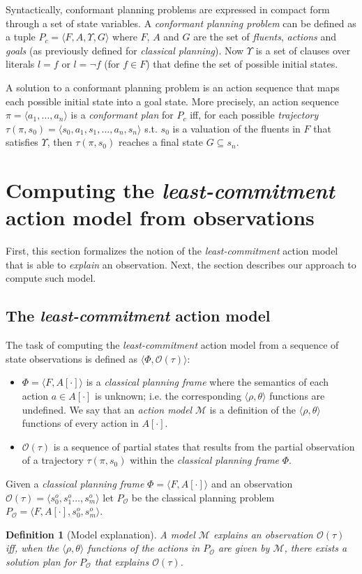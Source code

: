 \documentclass{article}
\newcommand{\tup}[1]{{\langle #1 \rangle}}
\newtheorem{definition}[theorem]{Definition}
\begin{document}
Syntactically, conformant planning problems are expressed in compact form through a set of state variables. A {\em conformant planning problem} can be defined as a tuple $P_c=\tup{F,A,\Upsilon,G}$ where $F$, $A$ and $G$ are the set of {\em fluents}, {\em actions} and {\em goals} (as previously defined for {\em classical planning}). Now $\Upsilon$ is a set of clauses over literals $l=f$ or $l=\neg f$ (for $f\in F$) that define the set of possible initial states. 

A solution to a conformant planning problem is an action sequence that maps each possible initial state into a goal state. More precisely, an action sequence $\pi=\tup{a_1, \ldots, a_n}$ is a {\em conformant plan} for $P_c$ iff, for each possible {\em trajectory} $\tau(\pi,s_0)=\tup{s_0, a_1, s_1, \ldots, a_n, s_n}$ s.t. $s_0$ is a valuation of the fluents in $F$ that satisfies $\Upsilon$, then $\tau(\pi,s_0)$ reaches a final state $G \subseteq s_n$. 


\section{Computing the {\em least-commitment} action model from observations}
First, this section formalizes the notion of the {\em least-commitment} action model that is able to {\em explain} an observation. Next, the section describes our approach to compute such model. 

\subsection{The {\em least-commitment} action model}
The task of computing the {\em least-commitment} action model from a sequence of state observations is defined as $\tup{\Phi,\mathcal{O}(\tau)}$:
\begin{itemize}
\item $\Phi=\tup{F,A[\cdot]}$ is a {\em classical planning frame} where the semantics of each action $a\in A[\cdot]$ is unknown; i.e. the corresponding $\tup{\rho,\theta}$ functions are undefined. We say that an {\em action model} $\mathcal{M}$ is a definition of the $\tup{\rho,\theta}$ functions of every action in $A[\cdot]$. 
\item $\mathcal{O}(\tau)$ is a sequence of partial states that results from the partial observation of a trajectory $\tau(\pi,s_0)$ within the {\em classical planning frame} $\Phi$.
\end{itemize}

Given a {\em classical planning frame} $\Phi=\tup{F,A[\cdot]}$ and an observation $\mathcal{O}(\tau)=\tup{s_0^o,s_1^o \ldots , s_m^o}$ let $P_\mathcal{O}$ be the classical planning problem $P_\mathcal{O}=\tup{F,A[\cdot],s_0^o,s_m^o}$.
\begin{definition}[Model explanation]
A model $\mathcal{M}$ {\em explains} an observation $\mathcal{O}(\tau)$ iff, when the $\tup{\rho,\theta}$ functions of the actions in $P_\mathcal{O}$ are given by $\mathcal{M}$, there exists a solution plan for $P_\mathcal{O}$ that {\em explains} $\mathcal{O}(\tau)$.  
\end{definition}
\end{document}
